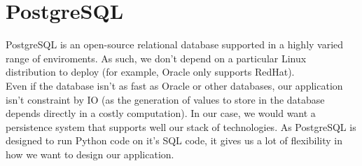 \section{PostgreSQL}

PostgreSQL\cite{postgres} is an open-source relational database supported in
a highly varied range of enviroments. As such, we don't depend on a particular
Linux distribution to deploy (for example, Oracle only supports RedHat).\\

Even if the database isn't as fast as Oracle or other databases, our
application isn't constraint by IO (as the generation of values to store in the
database depends directly in a costly computation). In our case, we would
want a persistence system that supports well our stack of technologies. As
PostgreSQL is designed to run Python code on it's SQL code, it gives us a lot
of flexibility in how we want to design our application.
